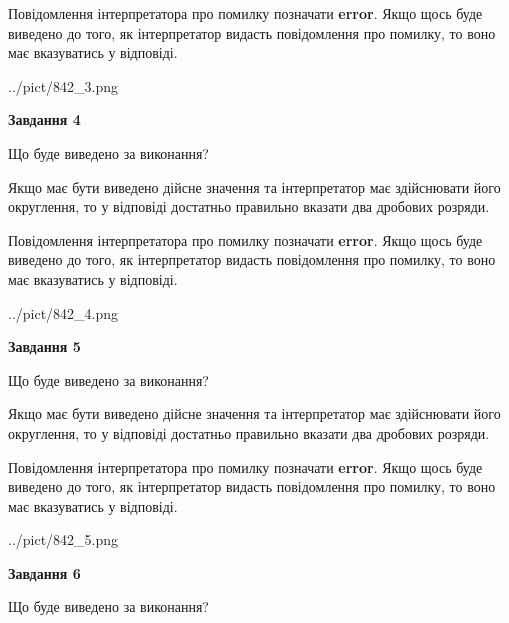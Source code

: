 \documentclass[12pt, ukrainian]{article}
\begin{document}
{\begin {Large}
Повідомлення інтерпретатора про помилку позначати \textbf{error}.
Якщо щось буде виведено до того, як інтерпретатор видасть повідомлення про помилку, 
то воно має вказуватись у відповіді. \par

\begin{center}
	{../pict/842_3.png}
\end{center}
\newpage

{\begin {center}\textbf{Завдання 4}\end {center}}\par
Що буде виведено за виконання? \par

Якщо має бути виведено дійсне значення та інтерпретатор має здійснювати його округлення, 
то у відповіді достатньо правильно вказати два дробових розряди.

Повідомлення інтерпретатора про помилку позначати \textbf{error}.
Якщо щось буде виведено до того, як інтерпретатор видасть повідомлення про помилку, 
то воно має вказуватись у відповіді. \par

\begin{center}
	{../pict/842_4.png}
\end{center}
\newpage

{\begin {center}\textbf{Завдання 5}\end {center}}\par
Що буде виведено за виконання? \par

Якщо має бути виведено дійсне значення та інтерпретатор має здійснювати його округлення, 
то у відповіді достатньо правильно вказати два дробових розряди.

Повідомлення інтерпретатора про помилку позначати \textbf{error}.
Якщо щось буде виведено до того, як інтерпретатор видасть повідомлення про помилку, 
то воно має вказуватись у відповіді. \par

\begin{center}
	{../pict/842_5.png}
\end{center}
\newpage

{\begin {center}\textbf{Завдання 6}\end {center}}\par
Що буде виведено за виконання? \par


\end{Large}}
\end{document}
